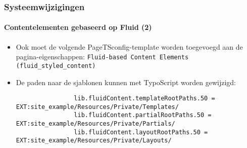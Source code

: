 
\begin{frame}[fragile]
	\frametitle{Systeemwijzigingen}
	\framesubtitle{Contentelementen gebaseerd op Fluid (2)}

	\lstset{basicstyle=\tiny\ttfamily}

	\begin{itemize}

		\item Ook moet de volgende PageTSconfig-template worden toegevoegd aan de pagina-eigenschappen:\newline
			\small
				\texttt{Fluid-based Content Elements (fluid\_styled\_content)}
			\normalsize

		\item De paden naar de sjablonen kunnen met TypoScript worden gewijzigd:

			\begin{lstlisting}
				lib.fluidContent.templateRootPaths.50 = EXT:site_example/Resources/Private/Templates/
				lib.fluidContent.partialRootPaths.50 = EXT:site_example/Resources/Private/Partials/
				lib.fluidContent.layoutRootPaths.50 = EXT:site_example/Resources/Private/Layouts/
			\end{lstlisting}

	\end{itemize}

\end{frame}


